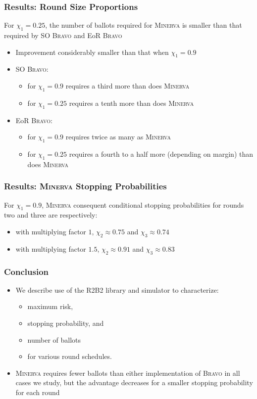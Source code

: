 \documentclass{beamer}
\newcommand{\Minerva}{\textsc{Minerva}\xspace}
\newcommand{\BRAVO}{\textsc{Bravo}\xspace}
\begin{document}
\begin{frame}
\frametitle{Results: Round Size Proportions}

For $\chi_1 = 0.25$, the number of ballots required for \Minerva is smaller than that required by SO \BRAVO and EoR \BRAVO
\pause 
\begin{itemize}
\item Improvement considerably smaller than that when $\chi_1=0.9$
\pause 
\item SO \BRAVO: 
\begin{itemize}
\item for $\chi_1 =0.9$ requires a third more than does \Minerva
\item for $\chi_1 = 0.25$ requires a tenth more than does \Minerva
\end{itemize}
\pause 
\item EoR \BRAVO:
\begin{itemize}
\item for $\chi_1 = 0.9$ requires twice as many as \Minerva
\item for $\chi_1 =0.25$ requires a fourth to a half more (depending on margin) than does \Minerva
\end{itemize}

\end{itemize}
\end{frame}
\begin{frame}
\frametitle{Results: \Minerva Stopping Probabilities}


For $\chi_1 = 0.9$, \Minerva consequent conditional stopping probabilities for rounds two and three are respectively:
\begin{itemize} 
\pause
\item with multiplying factor $1$, $\chi_2\approx 0.75$ and $\chi_3\approx 0.74$
\pause
\item with multiplying factor $1.5$, $\chi_2\approx 0.91$ and $\chi_3\approx 0.83$
\end{itemize}

\end{frame}

\begin{frame}
\frametitle{Conclusion}

\begin{itemize}

\item We describe use of the R2B2 library and simulator to characterize: 
\begin{itemize}
\pause
\item maximum risk, 
\pause
\item stopping probability, and 
\pause
\item number of ballots 
\pause
\item for various round schedules.
\pause
\end{itemize}
\item \Minerva requires fewer ballots than either implementation of \BRAVO in all cases we study, but the advantage decreases for a smaller stopping probability for each round

\end{itemize}

\end{frame}
\end{document}
